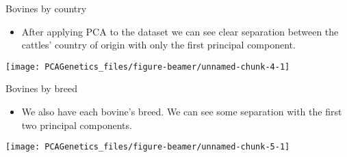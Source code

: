 \documentclass[ignorenonframetext,]{beamer}
\providecommand{\tightlist}{%
  \setlength{\itemsep}{0pt}\setlength{\parskip}{0pt}}
\begin{document}
\begin{frame}{Bovines by country}
\protect\hypertarget{bovines-by-country}{}

\begin{itemize}
\tightlist
\item
  After applying PCA to the dataset we can see clear separation between
  the cattles' country of origin with only the first principal
  component.
\end{itemize}

\begin{center}\texttt{[image: PCAGenetics\_files/figure-beamer/unnamed-chunk-4-1]} \end{center}

\end{frame}

\begin{frame}{Bovines by breed}
\protect\hypertarget{bovines-by-breed}{}

\begin{itemize}
\tightlist
\item
  We also have each bovine's breed. We can see some separation with the
  first two principal components.
\end{itemize}

\begin{center}\texttt{[image: PCAGenetics\_files/figure-beamer/unnamed-chunk-5-1]} \end{center}

\end{frame}
\end{document}
